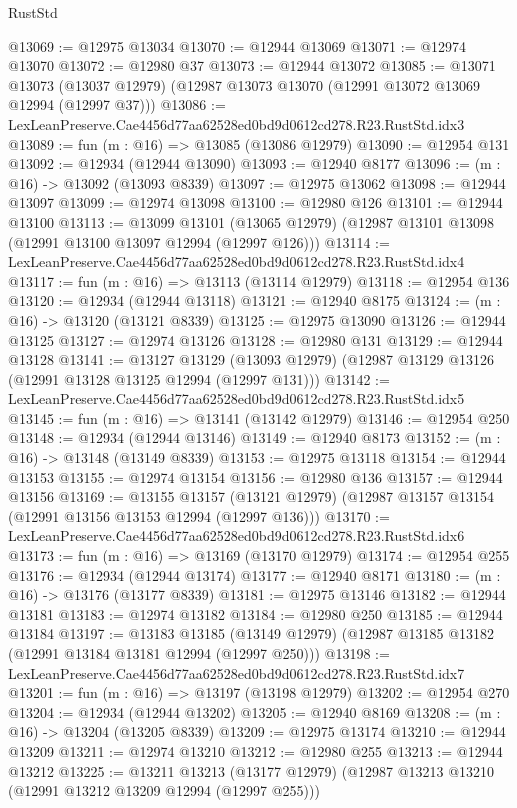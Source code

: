 \begin{lexlean}{RustStd}
\begin{coremodule}
@13069 := @12975 @13034
@13070 := @12944 @13069
@13071 := @12974 @13070
@13072 := @12980 @37
@13073 := @12944 @13072
@13085 := @13071
    @13073
    (@13037 @12979)
    (@12987 @13073 @13070 (@12991 @13072 @13069 @12994 (@12997 @37)))
@13086 := LexLeanPreserve.Cae4456d77aa62528ed0bd9d0612cd278.R23.RustStd.idx3
@13089 := fun (m : @16) => @13085 (@13086 @12979)
@13090 := @12954 @131
@13092 := @12934 (@12944 @13090)
@13093 := @12940 @8177
@13096 := (m : @16) -> @13092 (@13093 @8339)
@13097 := @12975 @13062
@13098 := @12944 @13097
@13099 := @12974 @13098
@13100 := @12980 @126
@13101 := @12944 @13100
@13113 := @13099
    @13101
    (@13065 @12979)
    (@12987 @13101 @13098 (@12991 @13100 @13097 @12994 (@12997 @126)))
@13114 := LexLeanPreserve.Cae4456d77aa62528ed0bd9d0612cd278.R23.RustStd.idx4
@13117 := fun (m : @16) => @13113 (@13114 @12979)
@13118 := @12954 @136
@13120 := @12934 (@12944 @13118)
@13121 := @12940 @8175
@13124 := (m : @16) -> @13120 (@13121 @8339)
@13125 := @12975 @13090
@13126 := @12944 @13125
@13127 := @12974 @13126
@13128 := @12980 @131
@13129 := @12944 @13128
@13141 := @13127
    @13129
    (@13093 @12979)
    (@12987 @13129 @13126 (@12991 @13128 @13125 @12994 (@12997 @131)))
@13142 := LexLeanPreserve.Cae4456d77aa62528ed0bd9d0612cd278.R23.RustStd.idx5
@13145 := fun (m : @16) => @13141 (@13142 @12979)
@13146 := @12954 @250
@13148 := @12934 (@12944 @13146)
@13149 := @12940 @8173
@13152 := (m : @16) -> @13148 (@13149 @8339)
@13153 := @12975 @13118
@13154 := @12944 @13153
@13155 := @12974 @13154
@13156 := @12980 @136
@13157 := @12944 @13156
@13169 := @13155
    @13157
    (@13121 @12979)
    (@12987 @13157 @13154 (@12991 @13156 @13153 @12994 (@12997 @136)))
@13170 := LexLeanPreserve.Cae4456d77aa62528ed0bd9d0612cd278.R23.RustStd.idx6
@13173 := fun (m : @16) => @13169 (@13170 @12979)
@13174 := @12954 @255
@13176 := @12934 (@12944 @13174)
@13177 := @12940 @8171
@13180 := (m : @16) -> @13176 (@13177 @8339)
@13181 := @12975 @13146
@13182 := @12944 @13181
@13183 := @12974 @13182
@13184 := @12980 @250
@13185 := @12944 @13184
@13197 := @13183
    @13185
    (@13149 @12979)
    (@12987 @13185 @13182 (@12991 @13184 @13181 @12994 (@12997 @250)))
@13198 := LexLeanPreserve.Cae4456d77aa62528ed0bd9d0612cd278.R23.RustStd.idx7
@13201 := fun (m : @16) => @13197 (@13198 @12979)
@13202 := @12954 @270
@13204 := @12934 (@12944 @13202)
@13205 := @12940 @8169
@13208 := (m : @16) -> @13204 (@13205 @8339)
@13209 := @12975 @13174
@13210 := @12944 @13209
@13211 := @12974 @13210
@13212 := @12980 @255
@13213 := @12944 @13212
@13225 := @13211
    @13213
    (@13177 @12979)
    (@12987 @13213 @13210 (@12991 @13212 @13209 @12994 (@12997 @255)))

\end{coremodule}
\end{lexlean}
